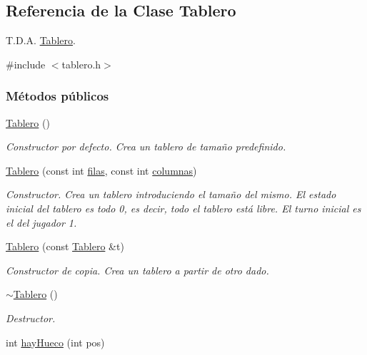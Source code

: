 \hypertarget{classTablero}{}\subsection{Referencia de la Clase Tablero}
\label{classTablero}


T.\+D.\+A. \hyperlink{classTablero}{Tablero}.  




{\ttfamily \#include $<$tablero.\+h$>$}

\subsubsection*{Métodos públicos}
\begin{DoxyCompactItemize}
\item 
\hyperlink{classTablero_ab4912f28f1db392e1dd44ddc98bd4f59}{Tablero} ()
\begin{DoxyCompactList}\small\item\em Constructor por defecto. Crea un tablero de tamaño predefinido. \end{DoxyCompactList}\item 
\hyperlink{classTablero_a51ae562c7dee2909d0fa335b8c3eaf71}{Tablero} (const int \hyperlink{classTablero_a6b1f04a8502106c33bf5469f791320e6}{filas}, const int \hyperlink{classTablero_ac70289ec91b44d05da648770cc46801d}{columnas})
\begin{DoxyCompactList}\small\item\em Constructor. Crea un tablero introduciendo el tamaño del mismo. El estado inicial del tablero es todo 0, es decir, todo el tablero está libre. El turno inicial es el del jugador 1. \end{DoxyCompactList}\item 
\hyperlink{classTablero_a95ccd1353038a966ad3304ead106c0d4}{Tablero} (const \hyperlink{classTablero}{Tablero} \&t)
\begin{DoxyCompactList}\small\item\em Constructor de copia. Crea un tablero a partir de otro dado. \end{DoxyCompactList}\item 
\hyperlink{classTablero_a7d4a64967ce0bbe2cce49ec846834c84}{$\sim$\+Tablero} ()
\begin{DoxyCompactList}\small\item\em Destructor. \end{DoxyCompactList}\item 
int \hyperlink{classTablero_ada687d3c234c4fb416ca76461adf6ba4}{hay\+Hueco} (int pos)

\end{DoxyCompactItemize}
